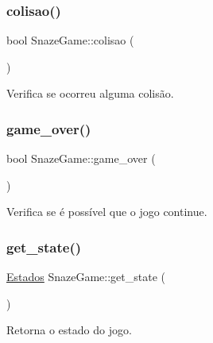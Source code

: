 \subsubsection{\texorpdfstring{colisao()}{colisao()}}
{\footnotesize\ttfamily bool Snaze\+Game\+::colisao (\begin{DoxyParamCaption}{ }\end{DoxyParamCaption})\hspace{0.3cm}{\ttfamily [inline]}}



Verifica se ocorreu alguma colisão. 

\mbox{\label{classSnazeGame_a5692397592a88a256071660b8bfe5231}} 
\subsubsection{\texorpdfstring{game\+\_\+over()}{game\_over()}}
{\footnotesize\ttfamily bool Snaze\+Game\+::game\+\_\+over (\begin{DoxyParamCaption}{ }\end{DoxyParamCaption})\hspace{0.3cm}{\ttfamily [inline]}}



Verifica se é possível que o jogo continue. 

\mbox{\label{classSnazeGame_a9b3002a7863a8c3f6fb5d6689ebf400a}} 
\subsubsection{\texorpdfstring{get\+\_\+state()}{get\_state()}}
{\footnotesize\ttfamily \hyperlink{classSnazeGame_a10ea6cb420042fdbfcade4f0261af5c1}{Estados} Snaze\+Game\+::get\+\_\+state (\begin{DoxyParamCaption}{ }\end{DoxyParamCaption})\hspace{0.3cm}{\ttfamily [inline]}}



Retorna o estado do jogo. 

\mbox{\label{classSnazeGame_ac104ea6197c75780b2e0f2da3a293caa}} 
